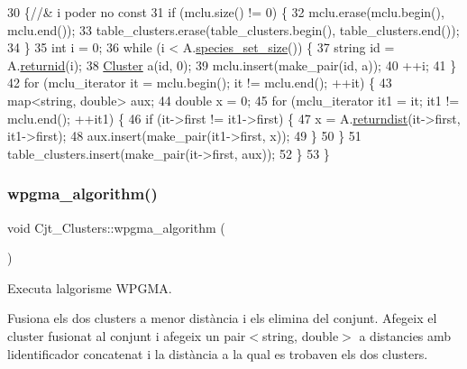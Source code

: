 \begin{DoxyCode}
30                                                       \{\textcolor{comment}{//& i poder no const}
31     \textcolor{keywordflow}{if} (mclu.size() != 0) \{
32         mclu.erase(mclu.begin(), mclu.end());
33         table\_clusters.erase(table\_clusters.begin(), table\_clusters.end());
34     \}
35     \textcolor{keywordtype}{int} i = 0;
36     \textcolor{keywordflow}{while} (i < A.\hyperlink{class_cjt___especies_a011e96e195dfe5997d42e7937fe2099c}{species\_set\_size}()) \{
37         \textcolor{keywordtype}{string} \textcolor{keywordtype}{id} = A.\hyperlink{class_cjt___especies_af33bf6763e518251a77642136064bdbf}{returnid}(i);
38         \hyperlink{class_cluster}{Cluster} a(\textcolor{keywordtype}{id}, 0);
39         mclu.insert(make\_pair(\textcolor{keywordtype}{id}, a));
40         ++i;
41     \}
42     \textcolor{keywordflow}{for} (mclu\_iterator it = mclu.begin(); it != mclu.end(); ++it) \{
43         map<string, double> aux;
44         \textcolor{keywordtype}{double} x = 0;
45         \textcolor{keywordflow}{for} (mclu\_iterator it1 = it; it1 != mclu.end(); ++it1) \{
46             \textcolor{keywordflow}{if} (it->first != it1->first) \{
47                 x = A.\hyperlink{class_cjt___especies_ae13d0a3a9f8b0ed9bba78b1c6c9d4eaa}{returndist}(it->first, it1->first);
48                 aux.insert(make\_pair(it1->first, x));
49             \}
50         \}
51         table\_clusters.insert(make\_pair(it->first, aux));
52     \}
53 \}
\end{DoxyCode}
\mbox{\label{class_cjt___clusters_ac2bf2811c291533e3516ad4de8240d36}} 
\subsubsection{\texorpdfstring{wpgma\+\_\+algorithm()}{wpgma\_algorithm()}}
{\footnotesize\ttfamily void Cjt\+\_\+\+Clusters\+::wpgma\+\_\+algorithm (\begin{DoxyParamCaption}{ }\end{DoxyParamCaption})}



Executa l\textquotesingle{}algorisme W\+P\+G\+MA. 

Fusiona els dos clusters a menor distància i els elimina del conjunt. Afegeix el cluster fusionat al conjunt i afegeix un pair$<$string, double$>$ a distancies amb l\textquotesingle{}identificador concatenat i la distància a la qual es trobaven els dos clusters.

